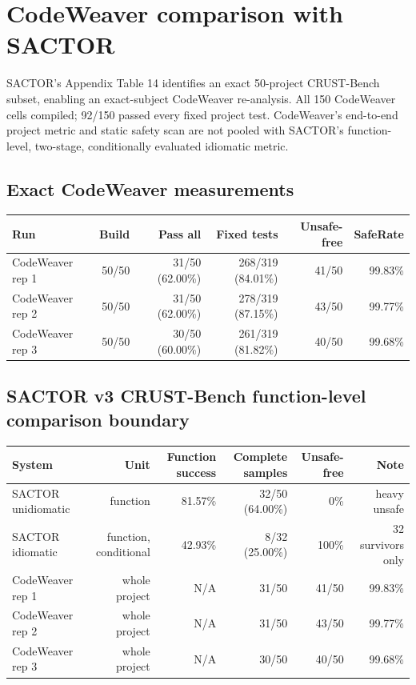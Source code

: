 \documentclass{article}
\begin{document}
\section*{CodeWeaver comparison with SACTOR}

SACTOR's Appendix Table 14 identifies an exact 50-project CRUST-Bench subset, enabling an exact-subject CodeWeaver re-analysis. All 150 CodeWeaver cells compiled; 92/150 passed every fixed project test. CodeWeaver's end-to-end project metric and static safety scan are not pooled with SACTOR's function-level, two-stage, conditionally evaluated idiomatic metric.

\subsection*{Exact CodeWeaver measurements}

\begin{tabular}{lrrrrr}
\toprule
Run & Build & Pass all & Fixed tests & Unsafe-free & SafeRate \\
\midrule
CodeWeaver rep 1 & 50/50 & 31/50 (62.00\%) & 268/319 (84.01\%) & 41/50 & 99.83\% \\
CodeWeaver rep 2 & 50/50 & 31/50 (62.00\%) & 278/319 (87.15\%) & 43/50 & 99.77\% \\
CodeWeaver rep 3 & 50/50 & 30/50 (60.00\%) & 261/319 (81.82\%) & 40/50 & 99.68\% \\
\bottomrule
\end{tabular}

\subsection*{SACTOR v3 CRUST-Bench function-level comparison boundary}

\begin{tabular}{lrrrrr}
\toprule
System & Unit & Function success & Complete samples & Unsafe-free & Note \\
\midrule
SACTOR unidiomatic & function & 81.57\% & 32/50 (64.00\%) & 0\% & heavy unsafe \\
SACTOR idiomatic & function, conditional & 42.93\% & 8/32 (25.00\%) & 100\% & 32 survivors only \\
CodeWeaver rep 1 & whole project & N/A & 31/50 & 41/50 & 99.83\% \\
CodeWeaver rep 2 & whole project & N/A & 31/50 & 43/50 & 99.77\% \\
CodeWeaver rep 3 & whole project & N/A & 30/50 & 40/50 & 99.68\% \\
\bottomrule
\end{tabular}
\end{document}
